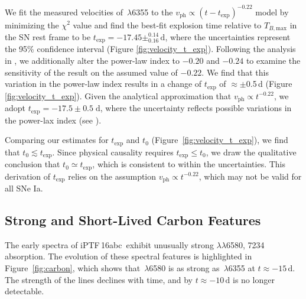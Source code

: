 \documentclass[twocolumn]{aastex61}
\newcommand{\abc}{iPTF\,16abc}
\begin{document}
We fit the measured velocities of \,$\lambda$6355 to the
$v_\mathrm{ph}\propto(t-t_\mathrm{exp})^{-0.22}$ model by minimizing the
$\chi^2$ value and find the best-fit explosion time relative to
$T_{B,\mathrm{max}}$ in the SN rest frame to be $t_\mathrm{exp} = -17.45 \pm
^{0.14}_{0.16}\,\textrm{d}$, where the uncertainties represent the 95\%
confidence interval (Figure \ref{fig:velocity_t_exp}). Following the analysis
in \citet{2014ApJ...784...85P}, we additionally alter the power-law index to
$-0.20$ and $-0.24$ to examine the sensitivity of the result on the assumed
value of $-0.22$. We find that this variation in the power-law index results
in a change of $t_\mathrm{exp}$ of $\approx\pm$0.5\,d (Figure
\ref{fig:velocity_t_exp}). Given the analytical approximation that
$v_\mathrm{ph} \propto t^{-0.22}$, we adopt $t_\mathrm{exp} = -17.5 \pm 0.5 \;
\mathrm{d}$, where the uncertainty reflects possible variations in the
power-lax index (see \citealt{2014ApJ...784...85P}).

Comparing our estimates for $t_\mathrm{exp}$ and $t_0$
(Figure~\ref{fig:velocity_t_exp}), we find that $t_0\lesssim t_\mathrm{exp}$.
Since physical causality requires $t_\mathrm{exp} \le t_0$, we draw the
qualitative conclusion that $t_0\simeq t_\mathrm{exp}$, which is consistent to
within the uncertainties. This derivation of $t_\mathrm{exp}$ relies on the
assumption $v_\mathrm{ph} \propto t^{-0.22}$, which may not be valid for all
SNe Ia.

\subsection{Strong and Short-Lived Carbon Features}
\label{sec:carbon}

The early spectra of \abc\ exhibit unusually strong  $\lambda\lambda$6580, 7234 absorption. The evolution of these
spectral features is highlighted in Figure~\ref{fig:carbon}, which shows that
\,$\lambda$6580 is as strong as \,$\lambda$6355 at $t
\approx -15 \, \mathrm{d}$. The strength of the  lines declines with
time, and by $t \approx -10 \, \mathrm{d}$  is no longer detectable.
\end{document}
